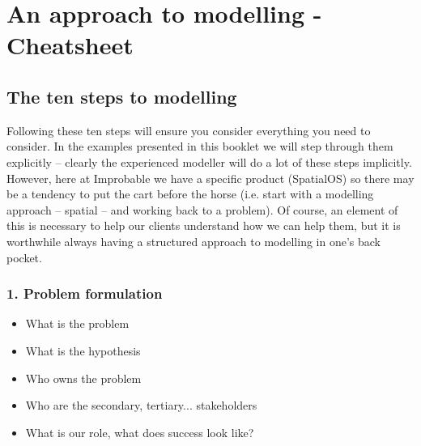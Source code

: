 \section{An approach to modelling - Cheatsheet}

\subsection{The ten steps to modelling}

Following these ten steps will ensure you consider everything you need to
consider.  In the examples presented in this booklet we will step through them
explicitly -- clearly the experienced modeller will do a lot of these steps
implicitly. However, here at Improbable we have a specific product (SpatialOS)
so there may be a tendency to put the cart before the horse (i.e. start with a
modelling approach -- spatial -- and working back to a problem). Of course, an
element of this is necessary to help our clients understand how we can help
them, but it is worthwhile always having a structured approach to modelling in
one's back pocket.

\subsubsection{1. Problem formulation}
\begin{itemize}
\item What is the problem
\item What is the hypothesis
\item Who owns the problem
\item Who are the secondary, tertiary... stakeholders
\item What is our role, what does success look like?
\end{itemize}

